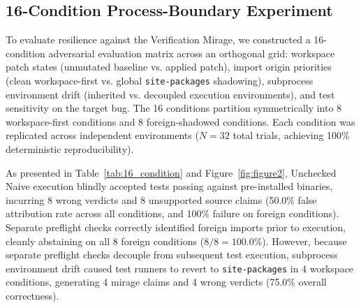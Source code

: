 \documentclass[10pt,twocolumn]{article}
\begin{document}
\subsection{16-Condition Process-Boundary Experiment}
To evaluate resilience against the Verification Mirage, we constructed a 16-condition adversarial evaluation matrix across an orthogonal grid: workspace patch states (unmutated baseline vs. applied patch), import origin priorities (clean workspace-first vs. global \texttt{site-packages} shadowing), subprocess environment drift (inherited vs. decoupled execution environments), and test sensitivity on the target bug. The 16 conditions partition symmetrically into 8 workspace-first conditions and 8 foreign-shadowed conditions. Each condition was replicated across independent environments ($N=32$ total trials, achieving 100\% deterministic reproducibility).

\begin{table}[t]
\centering
\small
\caption{Ablation of 16 Process-Boundary Conditions ($N=32$, 8 Workspace vs. 8 Foreign Conditions).}
\label{tab:16_condition}
\end{table}

As presented in Table~\ref{tab:16_condition} and Figure~\ref{fig:figure2}, Unchecked Naive execution blindly accepted tests passing against pre-installed binaries, incurring 8 wrong verdicts and 8 unsupported source claims (50.0\% false attribution rate across all conditions, and 100\% failure on foreign conditions). Separate preflight checks correctly identified foreign imports prior to execution, cleanly abstaining on all 8 foreign conditions ($8/8 = 100.0\%$). However, because separate preflight checks decouple from subsequent test execution, subprocess environment drift caused test runners to revert to \texttt{site-packages} in 4 workspace conditions, generating 4 mirage claims and 4 wrong verdicts (75.0\% overall correctness).
\end{document}
